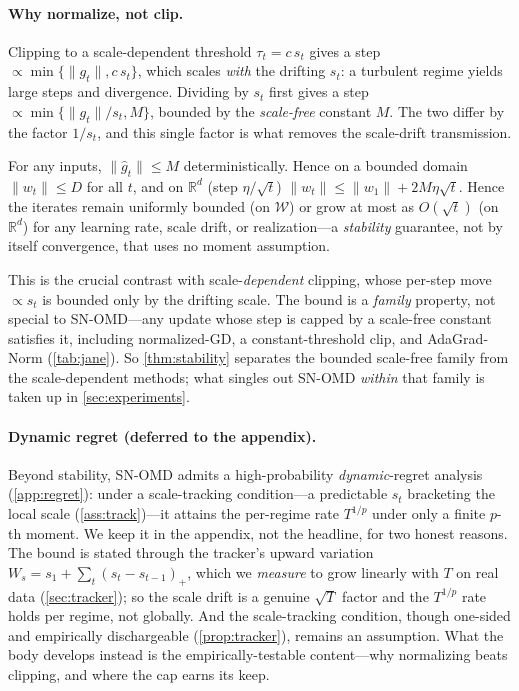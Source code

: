 \documentclass{article}
\newcommand{\R}{\mathbb{R}}
\newcommand{\norm}[1]{\lVert #1 \rVert}
\newcommand{\gt}{g_t}
\begin{document}
\paragraph{Why normalize, not clip.} Clipping to a scale-dependent threshold
$\tau_t=c\,s_t$ gives a step $\propto\min\{\norm{\gt},c\,s_t\}$, which scales
\emph{with} the drifting $s_t$: a turbulent regime yields large steps and divergence.
Dividing by $s_t$ first gives a step $\propto\min\{\norm{\gt}/s_t,M\}$, bounded by the
\emph{scale-free} constant $M$. The two differ by the factor $1/s_t$, and this single
factor is what removes the scale-drift transmission.

\begin{theorem}
\label{thm:stability}
For any inputs, $\norm{\hat g_t}\le M$ deterministically. Hence on a bounded domain
$\norm{w_t}\le D$ for all $t$, and on $\R^d$ (step $\eta/\sqrt t$)
$\norm{w_t}\le\norm{w_1}+2M\eta\sqrt t$. Hence the iterates remain uniformly bounded
(on $\mathcal W$) or grow at most as $O(\sqrt t)$ (on $\R^d$) for any learning rate,
scale drift, or realization---a \emph{stability} guarantee, not by itself convergence,
that uses no moment assumption.
\end{theorem}
This is the crucial contrast with scale-\emph{dependent} clipping, whose per-step move
$\propto s_t$ is bounded only by the drifting scale. The bound is a \emph{family}
property, not special to SN-OMD---any update whose step is capped by a scale-free
constant satisfies it, including normalized-GD, a constant-threshold clip, and
AdaGrad-Norm (\cref{tab:jane}). So \cref{thm:stability} separates the bounded scale-free
family from the scale-dependent methods; what singles out SN-OMD \emph{within} that
family is taken up in \cref{sec:experiments}.

\paragraph{Dynamic regret (deferred to the appendix).} Beyond stability, SN-OMD admits a
high-probability \emph{dynamic}-regret analysis (\cref{app:regret}): under a scale-tracking
condition---a predictable $s_t$ bracketing the local scale (\cref{ass:track})---it attains
the per-regime rate $T^{1/p}$ under only a finite $p$-th moment. We keep it in the appendix,
not the headline, for two honest reasons. The bound is stated through the tracker's upward
variation $W_s=s_1+\sum_t(s_t-s_{t-1})_+$, which we \emph{measure} to grow linearly with
$T$ on real data (\cref{sec:tracker}); so the scale drift is a genuine $\sqrt T$ factor and
the $T^{1/p}$ rate holds per regime, not globally. And the scale-tracking condition, though
one-sided and empirically dischargeable (\cref{prop:tracker}), remains an assumption. What
the body develops instead is the empirically-testable content---why normalizing beats
clipping, and where the cap earns its keep.
\end{document}

